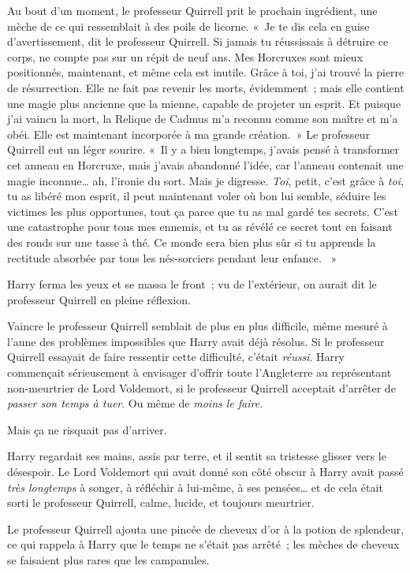 Au bout d'un moment, le professeur Quirrell prit le prochain ingrédient, une mèche de ce qui ressemblait à des poils de licorne.
«~Je te dis cela en guise d'avertissement, dit le professeur Quirrell.
Si jamais tu réussissais à détruire ce corps, ne compte pas sur un répit de neuf ans.
Mes Horcruxes sont mieux positionnés, maintenant, et même cela est inutile.
Grâce à toi, j'ai trouvé la pierre de résurrection.
Elle ne fait pas revenir les morts, évidemment~; mais elle contient une magie plus ancienne que la mienne, capable de projeter un esprit.
Et puisque j'ai vaincu la mort, la Relique de Cadmus m'a reconnu comme son maître et m'a obéi.
Elle est maintenant incorporée à ma grande création.~»
Le professeur Quirrell eut un léger sourire.
«~Il y a bien longtemps, j'avais pensé à transformer cet anneau en Horcruxe, mais j'avais abandonné l'idée, car l'anneau contenait une magie inconnue… ah, l'ironie du sort.
Mais je digresse.
\emph{Toi}, petit, c'est grâce à \emph{toi}, tu as libéré mon esprit, il peut maintenant voler où bon lui semble, séduire les victimes les plus opportunes, tout ça parce que tu as mal gardé tes secrets.
C'est une catastrophe pour tous mes ennemis, et tu as révélé ce secret tout en faisant des ronds sur une tasse à thé.
Ce monde sera bien plus sûr si tu apprends la rectitude absorbée par tous les nés-sorciers pendant leur enfance.
~»

Harry ferma les yeux et se massa le front~; vu de l'extérieur, on aurait dit le professeur Quirrell en pleine réflexion.

Vaincre le professeur Quirrell semblait de plus en plus difficile, même mesuré à l'aune des problèmes impossibles que Harry avait déjà résolus.
Si le professeur Quirrell essayait de faire ressentir cette difficulté, c'était \emph{réussi}.
Harry commençait sérieusement à envisager d'offrir toute l'Angleterre au représentant non-meurtrier de Lord Voldemort, si le professeur Quirrell acceptait d'arrêter de \emph{passer son temps à tuer}.
Ou même de \emph{moins le faire}.

Mais ça ne risquait pas d'arriver.

Harry regardait ses mains, assis par terre, et il sentit sa tristesse glisser vers le désespoir.
Le Lord Voldemort qui avait donné son côté obscur à Harry avait passé \emph{très longtemps} à songer, à réfléchir à lui-même, à ses pensées… et de cela était sorti le professeur Quirrell, calme, lucide, et toujours meurtrier.

Le professeur Quirrell ajouta une pincée de cheveux d'or à la potion de splendeur, ce qui rappela à Harry que le temps ne s'était pas arrêté~; les mèches de cheveux se faisaient plus rares que les campanules.

